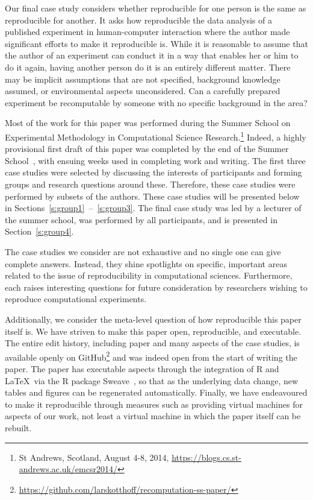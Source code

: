 Our final case study considers whether reproducible for one person is the same
as reproducible for another. It asks how reproducible the data analysis of a
published experiment in human-computer interaction where the author made
significant efforts to make it reproducible is. While it is reasonable to assume
that the author of an experiment can conduct it in a way that enables her or him
to do it again, having another person do it is an entirely different matter.
There may be implicit assumptions that are not specified, background knowledge
assumed, or environmental aspects unconsidered. Can a carefully prepared
experiment be recomputable by someone with no specific background in the area?

Most of the work for this paper was performed during the Summer School on
Experimental Methodology in Computational Science Research.\footnote{St
Andrews, Scotland, August 4-8, 2014,
\url{https://blogs.cs.st-andrews.ac.uk/emcsr2014/}}
Indeed, a highly
provisional first draft of this paper was completed by the end of the Summer
School~\cite{emcsr_arxiv_draft}, with ensuing weeks used in completing work and writing.  
The first three case studies
were selected by discussing the interests of participants and forming groups
and research questions around these. Therefore, these case studies were
performed by subsets of the authors. These case studies will be
presented below in Sections~\ref{s:group1}~--~\ref{s:group3}. The final case
study was led by a lecturer of the summer school, was performed by all
participants, and is presented in Section~\ref{s:group4}.

The case studies we consider are not exhaustive and no single one can give
complete answers. Instead, they shine spotlights on specific, important areas
related to the issue of reproducibility in computational sciences. Furthermore,
each raises interesting questions for future consideration by researchers
wishing to reproduce computational experiments.

Additionally, we consider the meta-level question of how reproducible this paper
itself is.  We have striven to make this paper open, reproducible, and
executable.
The entire edit history, including paper and many aspects of the
case studies, is available openly on
GitHub\footnote{\url{https://github.com/larskotthoff/recomputation-ss-paper/}} and was indeed open from the start
of writing the paper.  The paper has executable aspects through the integration of R
and \LaTeX\ via the R package Sweave~\cite{pineda-krch:sweave}, so that as the underlying
data change, new tables and figures can be regenerated automatically. Finally,
we have endeavoured to make it reproducible through measures such as providing
virtual machines for aspects of our work, not least a virtual machine in which
the paper itself can be rebuilt.
